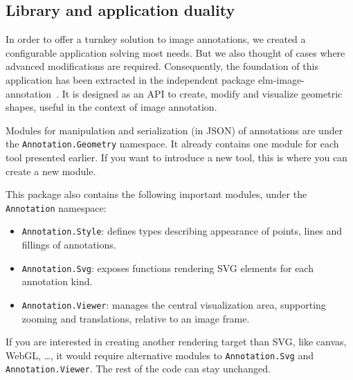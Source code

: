 

% 


\subsection{Library and application duality}

In order to offer a turnkey solution to image annotations,
we created a configurable application solving most needs.
But we also thought of cases where advanced modifications are required.
Consequently, the foundation of this application has been extracted
in the independent package elm-image-annotation~\cite{annotationpackage}.
It is designed as an API to create, modify and visualize geometric shapes,
useful in the context of image annotation.

Modules for manipulation and serialization (in JSON) of annotations are
under the \verb|Annotation.Geometry| namespace.
It already contains one module for each tool presented earlier.
If you want to introduce a new tool, this is where you can create a new module.

This package also contains the following important modules,
under the \verb|Annotation| namespace:
\begin{itemize}
	\item \verb|Annotation.Style|:
		defines types describing appearance of points, lines and fillings of annotations.
	\item \verb|Annotation.Svg|:
		exposes functions rendering SVG elements for each annotation kind.
	\item \verb|Annotation.Viewer|:
		manages the central visualization area,
		supporting zooming and translations, relative to an image frame.
\end{itemize}
If you are interested in creating another rendering target than SVG,
like canvas, WebGL, \ldots, it would require alternative modules
to \verb|Annotation.Svg| and \verb|Annotation.Viewer|.
The rest of the code can stay unchanged.
